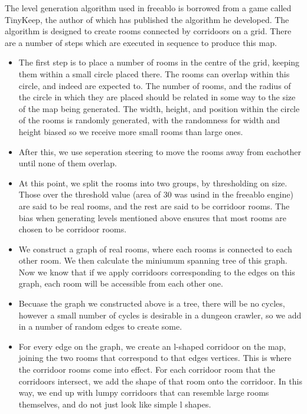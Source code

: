     The level generation algorithm used in freeablo is borrowed from a game called TinyKeep\cite{tinykeep}, the author of which has published the algorithm he developed\cite{tinygen}.
    The algorithm is designed to create rooms connected by corridoors on a grid.
    There are a number of steps which are executed in sequence to produce this map.
    \begin{itemize}
        \item
        {
            The first step is to place a number of rooms in the centre of the grid, keeping them within a small circle placed there.
            The rooms can overlap within this circle, and indeed are expected to. The number of rooms, and the radius of the circle in which they are placed
            should be related in some way to the size of the map being generated. The width, height, and position within the circle of the rooms is randomly generated, with the randomness for width and height biased so we receive more small rooms than large ones.    
        }
        \item
        {
            After this, we use seperation steering to move the rooms away from eachother until none of them overlap.
        }
        \item
        {
            At this point, we split the rooms into two groups, by thresholding on size. Those over the threshold value (area of 30 was usind in the freeablo engine) are said to be real rooms, and the rest are said to be corridoor rooms. The bias when generating levels mentioned above ensures that most rooms are chosen to be corridoor rooms.
        }
        \item
        {
            We construct a graph of real rooms, where each rooms is connected to each other room. We then calculate the miniumum spanning tree of this graph. Now we know that if we apply corridoors corresponding to the edges on this graph, each room will be accessible from each other one.
        }
        \item
        {
            Becuase the graph we constructed above is a tree, there will be no cycles, however a small number of cycles is desirable in a dungeon crawler, so we add in a number of random edges to create some.
        }
        \item
        {
            For every edge on the graph, we create an l-shaped corridoor on the map, joining the two rooms that correspond to that edges vertices.
            This is where the corridoor rooms come into effect. For each corridoor room that the corridoors intersect, we add the shape of that room onto the corridoor. In this way, we end up with lumpy corridoors that can resemble large rooms themselves, and do not just look like simple l shapes.
        }
    \end{itemize}
    
